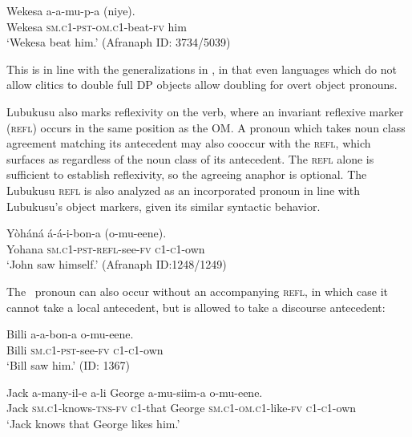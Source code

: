 \documentclass[output=paper,colorlinks,citecolor=brown]{langscibook}
\begin{document}
\ea%
    \label{ex:newkirk:6}
    \gll    Wekesa a-a-\alert{mu}-p-a (\alert{niye}). \\
			Wekesa \textsc{sm.c1-pst-\alert{om.c1}-}beat\textsc{-fv} \alert{him} \\
	\glt    `Wekesa beat him.' \hfill (Afranaph ID: 3734/5039)
\z

This is in line with the generalizations in \citet{Anagnostopoulou2016, Anagnostopoulou2017}, in that even languages which do not allow clitics to double full DP objects allow doubling for overt object pronouns.

Lubukusu also marks reflexivity on the verb, where an invariant reflexive marker (\textsc{refl}) occurs in the same position as the OM. A pronoun which takes noun class agreement matching its antecedent may also cooccur with the \textsc{refl}, which surfaces as  regardless of the noun class of its antecedent. The \textsc{refl} alone is sufficient to establish reflexivity, so the agreeing anaphor is optional. The Lubukusu \textsc{refl} is also analyzed as an incorporated pronoun in line with Lubukusu's object markers, given its similar syntactic behavior.

\ea%
    \label{ex:newkirk:7}
    \gll    Y\`oh\'an\'a \'a-\'a-\alert{i}-bon-a (o-mu-eene). \\
			Yohana \textsc{sm.c1-pst-\alert{refl}-}see\textsc{-fv} \textsc{c1-c1-}own \\
	\glt    `John saw himself.' \hfill (Afranaph ID:1248/1249)
\z

The \agre\ pronoun can also occur without an accompanying \textsc{refl}, in which case it cannot take a local antecedent, but is allowed to take a discourse antecedent:

\ea%
    \label{ex:newkirk:8}
    \gll    Billi a-a-bon-a o-mu-eene. \\
			Billi \textsc{sm.c1-pst}-see\textsc{-fv} \textsc{c1-c1-}own \\
	\glt    `Bill saw him.' \hfill (ID: 1367)
\z

\ea%
    \label{ex:newkirk:9}
    \gll    Jack a-many-il-e a-li George a-\alert{mu}-siim-a \alert{o-mu-eene}. \\
		    Jack \textsc{sm.c1-}knows\textsc{-tns-fv} \textsc{c1-}that George \textsc{sm.c1-\alert{om.c1}-}like\textsc{-fv} \alert{\textsc{c1-c1-}own} \\
	\glt    `Jack knows that George likes him.'
\z
\end{document}
